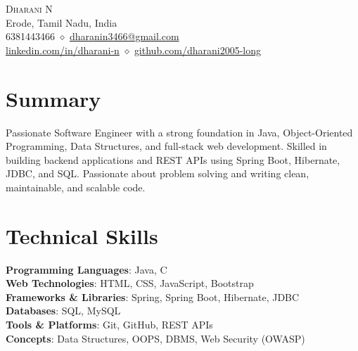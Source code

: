 \documentclass[letterpaper,11pt]{article}
\begin{document}
\begin{center}
    {\Huge \scshape Dharani N} \\ \vspace{5pt}
    \small
    Erode, Tamil Nadu, India \\ \vspace{2pt}
    6381443466 \quad $\diamond$ \quad
    \href{mailto:dharanin3466@gmail.com}{dharanin3466@gmail.com} \\ \vspace{2pt}
    \href{https://www.linkedin.com/in/dharani-n-717432269}{linkedin.com/in/dharani-n} \quad $\diamond$ \quad
    \href{https://github.com/dharani2005-long}{github.com/dharani2005-long}
\end{center}

\section{Summary}
\small{Passionate Software Engineer with a strong foundation in Java, Object-Oriented Programming, Data Structures, and full-stack web development. Skilled in building backend applications and REST APIs using Spring Boot, Hibernate, JDBC, and SQL. Passionate about problem solving and writing clean, maintainable, and scalable code.}
\vspace{-4pt}

\section{Technical Skills}
\begin{itemize}[leftmargin=0.15in, label={}]
  \small{\item{
    \textbf{Programming Languages}: Java, C \\ \vspace{2pt}
    \textbf{Web Technologies}: HTML, CSS, JavaScript, Bootstrap \\ \vspace{2pt}
    \textbf{Frameworks \& Libraries}: Spring, Spring Boot, Hibernate, JDBC \\ \vspace{2pt}
    \textbf{Databases}: SQL, MySQL \\ \vspace{2pt}
    \textbf{Tools \& Platforms}: Git, GitHub, REST APIs \\ \vspace{2pt}
    \textbf{Concepts}: Data Structures, OOPS, DBMS, Web Security (OWASP)
  }}
\end{itemize}
\vspace{-12pt}
\end{document}
